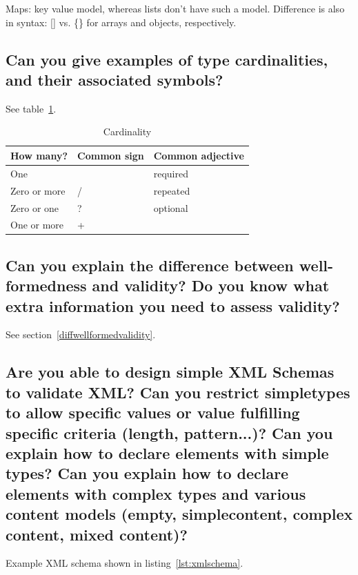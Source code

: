 \documentclass{article}
\begin{document}
Maps: key value model, whereas lists don't have such a model. Difference is also in syntax: [] vs. \{\} for arrays and objects, respectively.

\subsection{Can you give examples of type cardinalities, and their associated symbols?}

See table~\ref{tab:card}.

\begin{table}
  \centering
  \begin{tabular}{lll}
    \toprule
    How many? & Common sign & Common adjective\\
    \midrule
    One &  & required\\
    Zero or more & / & repeated\\
    Zero or one & ? & optional\\
    One or more & + & \\
    \bottomrule
  \end{tabular}
  \caption{Cardinality}
  \label{tab:card}
\end{table}

\subsection{Can you explain the difference between well-formedness and validity? Do you know what extra information you need to assess validity?}

See section~\ref{diffwellformedvalidity}.


\subsection{Are you able to design simple XML Schemas to validate XML? Can you restrict simpletypes to allow specific values or value fulfilling specific criteria (length, pattern...)? Can you explain how to declare elements with simple types? Can you explain how to declare elements with complex types and various content models (empty, simplecontent, complex content, mixed content)?}

Example XML schema shown in listing~\ref{lst:xmlschema}.
\end{document}

